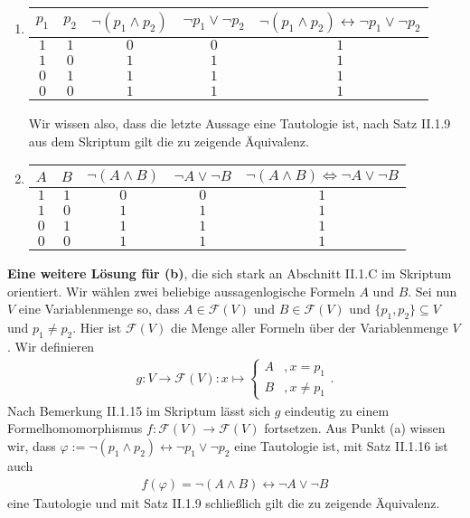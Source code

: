 \begin{solution}
\phantom{}
\begin{enumerate}[label = \alph*]
    \item \begin{tabular}{|c|c|c|c|c|}
    \hline
    $p_1$ & $p_2$ & $\neg (p_1 \land p_2)$ & $\neg p_1 \lor \neg p_2$ & $\neg (p_1 \land p_2) \leftrightarrow \neg p_1 \lor \neg p_2$ \\
    \hline
    $1$ & $1$ & $0$ & $0$ & $1$\\
    \hline
    $1$ & $0$ & $1$ & $1$ & $1$\\
    \hline
    $0$ & $1$ & $1$ & $1$ & $1$\\
    \hline
    $0$ & $0$ & $1$ & $1$ & $1$\\
    \hline
    \end{tabular}
	Wir wissen also, dass die letzte Aussage eine Tautologie ist, nach Satz II.1.9 aus dem Skriptum gilt die zu zeigende Äquivalenz.
    \item \begin{tabular}{|c|c|c|c|c|}
    \hline
    $A$ & $B$ & $\neg (A \land B)$ & $\neg A \lor \neg B$ & $\neg (A \land B) \Leftrightarrow \neg A \lor \neg B$ \\
    \hline
    $1$ & $1$ & $0$ & $0$ & $1$\\
    \hline
    $1$ & $0$ & $1$ & $1$ & $1$\\
    \hline
    $0$ & $1$ & $1$ & $1$ & $1$\\
    \hline
    $0$ & $0$ & $1$ & $1$ & $1$\\
    \hline
    \end{tabular}
\end{enumerate}
\textbf{Eine weitere Lösung für (b)}, die sich stark an Abschnitt II.1.C im Skriptum orientiert. Wir wählen zwei beliebige aussagenlogische Formeln $A$ und $B$. Sei nun $V$ eine Variablenmenge so, dass $A \in \mathcal{F}(V)$ und $B \in \mathcal{F}(V)$ und $\{p_1, p_2\} \subseteq V$ und $p_1 \neq p_2$. Hier ist $\mathcal{F}(V)$ die Menge aller Formeln über der Variablenmenge $V$. Wir definieren
\begin{align*}
g: V \to \mathcal{F}(V): x \mapsto
\begin{cases}
A & , x = p_1 \\
B & , x \neq p_1
\end{cases}.
\end{align*}
Nach Bemerkung II.1.15 im Skriptum lässt sich $g$ eindeutig zu einem Formelhomomorphismus $f:\mathcal{F}(V) \to \mathcal{F}(V)$ fortsetzen. Aus Punkt (a) wissen wir, dass $\varphi := \neg (p_1 \land p_2) \leftrightarrow \neg p_1 \lor \neg p_2$ eine Tautologie ist, mit Satz II.1.16 ist auch 
\begin{align*}
f(\varphi) = \neg (A \land B) \leftrightarrow \neg A \lor \neg B
\end{align*}
eine Tautologie und mit Satz II.1.9 schließlich gilt die zu zeigende Äquivalenz.
\end{solution}

